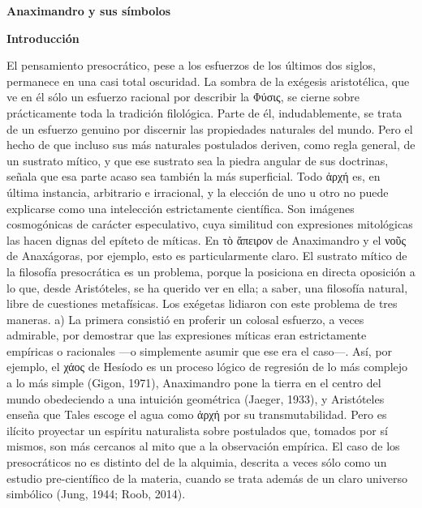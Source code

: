 \documentclass[a4paper]{article}
\begin{document}
\textbf{Anaximandro y sus símbolos}

\textbf{Introducción}

El pensamiento presocrático, pese a los esfuerzos de los últimos dos siglos,
permanece en una casi total oscuridad. La sombra de la exégesis aristotélica,
que ve en él sólo un esfuerzo racional por describir la Φύσις, se cierne sobre
prácticamente toda la tradición filológica. Parte de él, indudablemente, se
trata de un esfuerzo genuino por discernir las propiedades naturales del mundo.
Pero el hecho de que incluso sus más naturales postulados deriven, como regla
general, de un sustrato mítico, y que ese sustrato sea la piedra angular de sus
doctrinas, señala que esa parte acaso sea también la más superficial. Todo ἀρχή
es, en última instancia, arbitrario e irracional, y la elección de uno u otro no
puede explicarse como una intelección estrictamente científica. Son imágenes
cosmogónicas de carácter especulativo, cuya similitud con expresiones
mitológicas las hacen dignas del epíteto de míticas. En τὸ ἄπειρον de
Anaximandro y el νοῦς de Anaxágoras, por ejemplo, esto es particularmente claro.
El sustrato mítico de la filosofía presocrática es un problema, porque la
posiciona en directa oposición a lo que, desde Aristóteles, se ha querido ver en
ella; a saber, una filosofía natural, libre de cuestiones metafísicas. Los
exégetas lidiaron con este problema de tres maneras. a) La primera consistió en
proferir un colosal esfuerzo, a veces admirable, por demostrar que las
expresiones míticas eran estrictamente empíricas o racionales —o simplemente
asumir que ese era el caso—. Así, por ejemplo, el χάος de Hesíodo es un proceso
lógico de regresión de lo más complejo a lo más simple (Gigon, 1971),
Anaximandro pone la tierra en el centro del mundo obedeciendo a una intuición
geométrica (Jaeger, 1933), y Aristóteles enseña que Tales escoge el agua como
ἀρχή por su transmutabilidad. Pero es ilícito proyectar un espíritu naturalista
sobre postulados que, tomados por sí mismos, son más cercanos al mito que a la
observación empírica. El caso de los presocráticos no es distinto del de la
alquimia, descrita a veces sólo como un estudio pre-científico de la materia,
cuando se trata además de un claro universo simbólico (Jung, 1944; Roob, 2014). 
\end{document}
